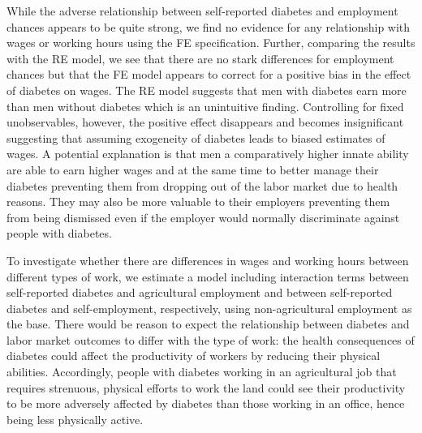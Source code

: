 \documentclass[12pt,english,british]{article}
\begin{document}
While the adverse relationship between self-reported diabetes and
employment chances appears to be quite strong, we find no evidence
for any relationship with wages or working hours using the \ac{FE} specification. Further, comparing the results with the \ac{RE} model, we see that there are no stark differences for employment chances but that the \ac{FE} model appears to correct for a positive bias in the effect of diabetes on wages. The \ac{RE} model suggests that men with diabetes earn more than men without diabetes which is an unintuitive finding. Controlling for fixed unobservables, however, the positive effect disappears and becomes insignificant suggesting that assuming exogeneity of diabetes leads to biased estimates of wages. A potential explanation is that men a comparatively higher innate ability are able to earn higher wages and at the same time to better manage their diabetes preventing them from dropping out of the labor market due to health reasons. They may also be more valuable to their employers preventing them from being dismissed even if the employer would normally discriminate against people with diabetes.



To investigate whether there are differences in
wages and working hours between different types of work, we estimate
a model including interaction terms between self-reported diabetes
and agricultural employment and between self-reported diabetes and
self-employment, respectively, using non-agricultural employment as
the base. There would be reason to expect the relationship between
diabetes and labor market outcomes to differ with the type of work:
the health consequences of diabetes could affect the productivity
of workers by reducing their physical abilities. Accordingly, people
with diabetes working in an agricultural job that requires strenuous,
physical efforts to work the land could see their productivity to be
more adversely affected by diabetes than those working in an office,
hence being less physically active. 
\end{document}
